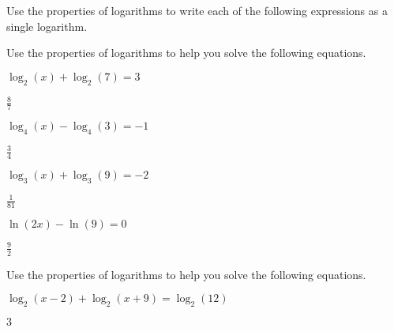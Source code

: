 \begin{exercises}
\begin{problem}
Use the properties of logarithms to write each of the following 
expressions as a single logarithm.
\end{problem}

\begin{problem}
Use the properties of logarithms to help you solve the following 
equations.
\begin{multicols}{2} 
	\begin{subproblem}
		$\log_2(x)+\log_2(7)=3$ 
		\begin{shortsolution}
			$\frac{8}{7}$
		\end{shortsolution}
	\end{subproblem}
	\begin{subproblem}
		$\log_4(x)-\log_4(3)=-1$ 
		\begin{shortsolution}
			$\frac{3}{4}$ 
		\end{shortsolution}
	\end{subproblem}
	\begin{subproblem}
		$\log_3(x)+\log_3(9)=-2$ 
		\begin{shortsolution}
			$\frac{1}{81}$
		\end{shortsolution}
	\end{subproblem}
	\begin{subproblem}
		$\ln(2x)-\ln(9)=0$ 
		\begin{shortsolution}
			$\frac{9}{2}$
		\end{shortsolution}
	\end{subproblem}
\end{multicols}
\end{problem}
\begin{problem}
Use the properties of logarithms to help you solve the following 
equations.
\begin{multicols}{2}
	\begin{subproblem}
		$\log_2(x-2)+\log_2(x+9)=\log_2(12)$ 
		\begin{shortsolution}
			$3$
		\end{shortsolution}

\end{subproblem}
\end{multicols}
\end{problem}
\end{exercises}
